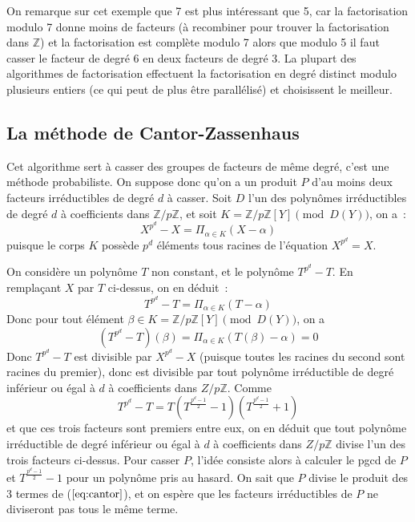 \documentclass[a4paper,11pt]{book}
\begin{document}
\begin{giacjshere}
On remarque sur cet exemple que 7 est plus intéressant que 5, car
la factorisation modulo 7 donne moins de facteurs (à recombiner pour
trouver la factorisation dans $\mathbb{Z}$) et la factorisation est
complète modulo 7 alors que modulo 5 il faut casser le facteur de
degré 6 en deux facteurs de degré 3. La plupart des algorithmes
de factorisation effectuent la factorisation en degré distinct
modulo plusieurs entiers (ce qui peut de plus être parallélisé)
et choisissent le meilleur.

\subsection{La méthode de Cantor-Zassenhaus}
Cet algorithme sert à casser des groupes de facteurs de même degré,
c'est une méthode probabiliste. On suppose donc qu'on a un produit $P$
d'au moins deux facteurs irréductibles de degré $d$ à casser.
Soit $D$ l'un des polynômes irréductibles de degré $d$ à coefficients
dans $\mathbb{Z}/p\mathbb{Z}$, et soit $K=\mathbb{Z}/p\mathbb{Z}[Y] \pmod {D(Y)}$, on a~:
\[X^{p^d}-X=\Pi_{\alpha \in K }(X-\alpha) \]
puisque le corps $K$ possède $p^d$ éléments tous racines
de l'équation $X^{p^d}=X$.

On considère un polynôme $T$ non constant, et le polynôme
$T^{p^d}-T$. En remplaçant $X$ par $T$ ci-dessus, on en déduit~:
\[T^{p^d}-T=\Pi_{\alpha \in K }(T-\alpha) \]
Donc pour tout élément $\beta \in K=\mathbb{Z}/p\mathbb{Z}[Y] \pmod {D(Y)}$, on a
\[(T^{p^d}-T)(\beta)=\Pi_{\alpha \in K }(T(\beta)-\alpha)=0\]
Donc $T^{p^d}-T$ est divisible par $X^{p^d}-X$ (puisque toutes les racines
du second sont racines du premier), donc est divisible par tout polynôme
irréductible de degré inférieur ou égal à $d$ à coefficients dans $Z/p\mathbb{Z}$.
Comme
\begin{equation} \label{eq:cantor}
T^{p^d}-T=T(T^{\frac{p^d-1}{2}}-1)(T^{\frac{p^d-1}{2}}+1)
\end{equation}
et que ces trois facteurs sont premiers entre eux, on en déduit que tout 
polynôme irréductible de degré inférieur ou égal à $d$ à coefficients dans 
$Z/p\mathbb{Z}$ divise l'un des trois facteurs ci-dessus. Pour casser $P$, l'idée
consiste alors à calculer le pgcd de $P$ et $T^{\frac{p^d-1}{2}}-1$
pour un polynôme pris au hasard. On sait que $P$ divise le produit des
3 termes de (\(\ref{eq:cantor}\)), et on espère que les facteurs irréductibles
de $P$ ne diviseront pas tous le même terme.


\end{giacjshere}
\end{document}
